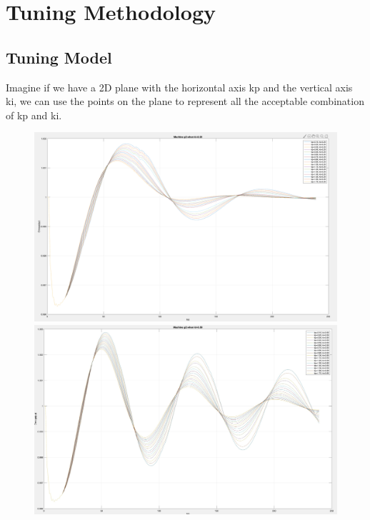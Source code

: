 \section{Tuning Methodology } %
\label{section3.4}
\subsection{Tuning Model} %
Imagine if we have a 2D plane with the horizontal axis kp and the vertical axis ki, we can use the points on the plane to represent all the acceptable combination of kp and ki. 

\begin{figure}[!htbp]
  \includegraphics[width= \linewidth]{figure/3_4_1_tune_ki_1.png}
\endminipage\hfill
{}
  \includegraphics[width= \linewidth]{figure/3_4_1_tune_ki_2.jpeg}
\endminipage\hfill

\end{figure}
